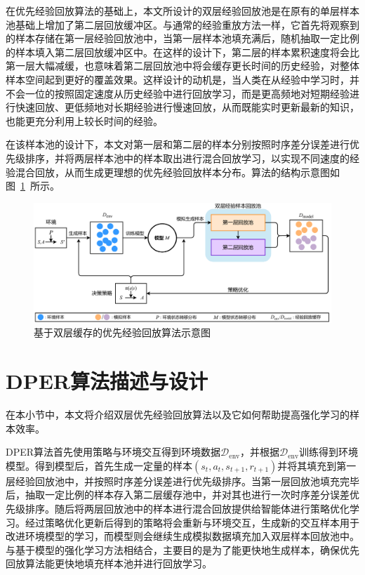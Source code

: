 在优先经验回放算法的基础上，本文所设计的双层经验回放池是在原有的单层样本池基础上增加了第二层回放缓冲区。与通常的经验重放方法一样，它首先将观察到的样本存储在第一层经验回放池中，当第一层样本池填充满后，随机抽取一定比例的样本填入第二层回放缓冲区中。在这样的设计下，第二层的样本累积速度将会比第一层大幅减缓，也意味着第二层回放池中将会缓存更长时间的历史经验，对整体样本空间起到更好的覆盖效果。这样设计的动机是，当人类在从经验中学习时，并不会一位的按照固定速度从历史经验中进行回放学习，而是更高频地对短期经验进行快速回放、更低频地对长期经验进行慢速回放，从而既能实时更新最新的知识，也能更充分利用上较长时间的经验。

在该样本池的设计下，本文对第一层和第二层的样本分别按照时序差分误差进行优先级排序，并将两层样本池中的样本取出进行混合回放学习，以实现不同速度的经验混合回放，从而生成更理想的优先经验回放样本分布。算法的结构示意图如图~\ref{fig:algo-structure}~所示。

\begin{figure}[ht]
\centering
\includegraphics[width=\textwidth]{figures/dber.pdf}
\caption{基于双层缓存的优先经验回放算法示意图}
\label{fig:algo-structure}
\end{figure}

\section{DPER算法描述与设计}

在本小节中，本文将介绍双层优先经验回放算法以及它如何帮助提高强化学习的样本效率。

DPER算法首先使用策略与环境交互得到环境数据$\mathcal{D}_{\text{env}}$，并根据$\mathcal{D}_{\text{env}}$训练得到环境模型。得到模型后，首先生成一定量的样本$(s_t, a_t, s_{t+1}, r_{t+1})$并将其填充到第一层经验回放池中，并按照时序差分误差进行优先级排序。当第一层回放池填充完毕后，抽取一定比例的样本存入第二层缓存池中，并对其也进行一次时序差分误差优先级排序。随后将两层回放池中的样本进行混合回放提供给智能体进行策略优化学习。经过策略优化更新后得到的策略将会重新与环境交互，生成新的交互样本用于改进环境模型的学习，而模型则会继续生成模拟数据填充加入双层样本回放池中。与基于模型的强化学习方法相结合，主要目的是为了能更快地生成样本，确保优先回放算法能更快地填充样本池并进行回放学习。

